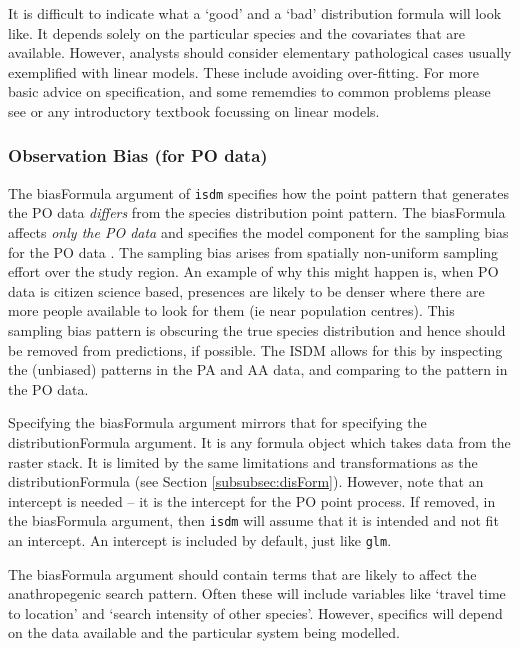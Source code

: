 \documentclass[article,shortnames,nojss]{jss}\usepackage[]{graphicx}\usepackage[]{xcolor}
\begin{document}
It is difficult to indicate what a `good' and a `bad' distribution formula will look like. It depends solely on the particular species and the covariates that are available. However, analysts should consider elementary pathological cases usually exemplified with linear models. These include avoiding over-fitting. For more basic advice on specification, and some rememdies to common problems please see \citet{net96} or any introductory textbook focussing on linear models.

\subsubsection*{Observation Bias (for PO data)}

The biasFormula argument of \texttt{isdm} specifies how the point pattern that generates the PO data \textit{differs} from the species distribution point pattern. The biasFormula affects \textit{only the PO data} and specifies the model component for the sampling bias for the PO data \citep[see][for example]{war13}. The sampling bias arises from spatially non-uniform sampling effort over the study region. An example of why this might happen is, when PO data is citizen science based, presences are likely to be denser where there are more people available to look for them (ie near population centres). This sampling bias pattern is obscuring the true species distribution and hence should be removed from predictions, if possible. The ISDM allows for this by inspecting the (unbiased) patterns in the PA and AA data, and comparing to the pattern in the PO data.

Specifying the biasFormula argument mirrors that for specifying the distributionFormula argument. It is any formula object which takes data from the raster stack. It is limited by the same limitations and transformations as the distributionFormula (see Section \ref{subsubsec:disForm}). However, note that an intercept is needed -- it is the intercept for the PO point process. If removed, in the biasFormula argument, then \texttt{isdm} will assume that it is intended and not fit an intercept. An intercept is included by default, just like \texttt{glm}.

The biasFormula argument should contain terms that are likely to affect the anathropegenic search pattern. Often these will include variables like `travel time to location' and `search intensity of other species'. However, specifics will depend on the data available and the particular system being modelled.
\end{document}
